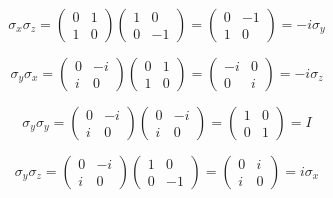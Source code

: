 \begin{enumerate}
    $$
    \sigma_x\sigma_z = 
    \begin{pmatrix}
        0 & 1\\
        1 & 0
    \end{pmatrix}
    \begin{pmatrix}
        1 & 0\\
        0 & -1
    \end{pmatrix}
    =\begin{pmatrix}
        0 & -1\\
        1 & 0
    \end{pmatrix}
    =-i\sigma_y
    $$



    $$
    \sigma_y\sigma_x = 
    \begin{pmatrix}
        0 & -i\\
        i & 0
    \end{pmatrix}
    \begin{pmatrix}
        0 & 1\\
        1 & 0
    \end{pmatrix}
    =\begin{pmatrix}
        -i & 0\\
        0 & i
    \end{pmatrix}
    =-i\sigma_z
    $$
    
    $$
    \sigma_y\sigma_y = 
    \begin{pmatrix}
        0 & -i\\
        i & 0
    \end{pmatrix}
    \begin{pmatrix}
        0 & -i\\
        i & 0
    \end{pmatrix}
    =\begin{pmatrix}
        1 & 0\\
        0 & 1
    \end{pmatrix}
    =I
    $$

    $$
    \sigma_y\sigma_z = 
    \begin{pmatrix}
        0 & -i\\
        i & 0
    \end{pmatrix}
    \begin{pmatrix}
        1 & 0\\
        0 & -1
    \end{pmatrix}
    =\begin{pmatrix}
        0 & i\\
        i & 0
    \end{pmatrix}
    =i\sigma_x
    $$


\end{enumerate}
